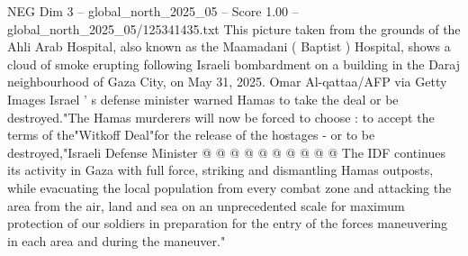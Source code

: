 \begin{textsample}{NEG Dim 3 – global\_north\_2025\_05 – Score 1.00 – global\_north\_2025\_05/125341435.txt}
This picture taken from the grounds of the Ahli Arab Hospital, also known as the Maamadani ( Baptist ) Hospital, shows a cloud of smoke erupting following Israeli bombardment on a building in the Daraj neighbourhood of Gaza City, on May 31, 2025.
Omar Al-qattaa/AFP via Getty Images Israel ' s defense minister warned Hamas to take the deal or be destroyed."The Hamas murderers will now be forced to choose : to accept the terms of the"Witkoff Deal"for the release of the hostages - or to be destroyed,"Israeli Defense Minister @ @ @ @ @ @ @ @ @ @ The IDF continues its activity in Gaza with full force, striking and dismantling Hamas outposts, while evacuating the local population from every combat zone and attacking the area from the air, land and sea on an unprecedented scale for maximum protection of our soldiers in preparation for the entry of the forces maneuvering in each area and during the maneuver."

\end{textsample}

